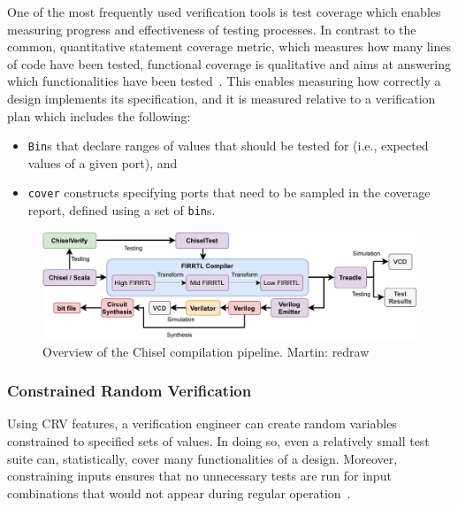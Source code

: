 \documentclass[conference]{IEEEtran}
\newcommand{\martin}[1]{{\color{blue} Martin: #1}}
\begin{document}
One of the most frequently used verification tools is test coverage which enables measuring 
progress and effectiveness of testing processes. In contrast to the common, quantitative statement 
coverage metric, which measures how many lines of code have been tested, functional coverage is 
qualitative and aims at answering which functionalities have been 
tested~\cite{spear2008systemverilog}. This enables measuring how correctly a design implements its 
specification, and it is measured relative to a verification plan which includes the following:

\begin{itemize}
  \item \texttt{Bin}s that declare ranges of values that should be tested for (i.e., expected values of a given port), and 
  \item \texttt{cover} constructs specifying ports that need to be sampled in the coverage report, defined using a set of \texttt{bin}s.
\end{itemize}

\begin{figure}
  \centering
    \includegraphics[width=0.8\linewidth]{Chisel_FIRRTL_VERILOG.pdf}
    \caption{Overview of the Chisel compilation pipeline. \martin{redraw}}
\label{fig:chisel-pipe}
\end{figure}

\subsubsection{Constrained Random Verification}

Using CRV features, a verification engineer can create random variables constrained to 
specified sets of values. In doing so, even a relatively small test suite can, statistically, 
cover many functionalities of a design. Moreover, constraining inputs ensures that no 
unnecessary tests are run for input combinations that would not appear during regular 
operation~\cite{MehtaCRV2018}.
\end{document}
